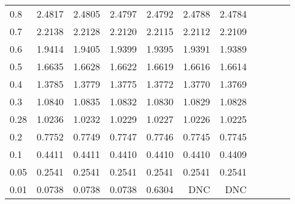 \begin{landscape}
\begin{table}
\begin{center}
\begin{tabular}{l|rrrrrrrrrr}
0.8 & 2.4817 & 2.4805 & 2.4797 & 2.4792 & 2.4788 & 2.4784  \\ 
0.7 & 2.2138 & 2.2128 & 2.2120 & 2.2115 & 2.2112 & 2.2109  \\ 
0.6 & 1.9414 & 1.9405 & 1.9399 & 1.9395 & 1.9391 & 1.9389  \\ 
0.5 & 1.6635 & 1.6628 & 1.6622 & 1.6619 & 1.6616 & 1.6614  \\ 
0.4 & 1.3785 & 1.3779 & 1.3775 & 1.3772 & 1.3770 & 1.3769  \\ 
0.3 & 1.0840 & 1.0835 & 1.0832 & 1.0830 & 1.0829 & 1.0828  \\ 
0.28 & 1.0236 & 1.0232 & 1.0229 & 1.0227 & 1.0226 & 1.0225  \\ 
0.2 & 0.7752 & 0.7749 & 0.7747 & 0.7746 & 0.7745 & 0.7745  \\ 
0.1 & 0.4411 & 0.4411 & 0.4410 & 0.4410 & 0.4410 & 0.4409  \\ 
0.05 & 0.2541 & 0.2541 & 0.2541 & 0.2541 & 0.2541 & 0.2541  \\ 
0.01 & 0.0738 & 0.0738 & 0.0738 & 0.6304 & DNC & DNC  \\
\hline \hline
\end{tabular}
\end{center}
\end{table}
\end{landscape}


